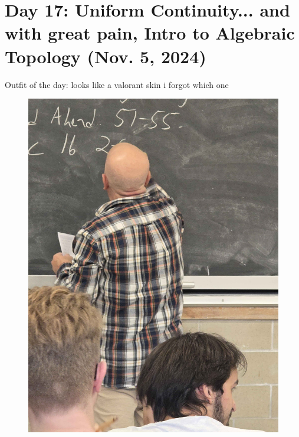 \section{Day 17: Uniform Continuity... and with great pain, Intro to Algebraic Topology (Nov. 5, 2024)}
Outfit of the day: looks like a valorant skin i forgot which one
\begin{figure}[h]
    \centering
    \includegraphics[scale=0.1]{MAT327 Notes/Dror Shirts/dror day 17 shirt.jpg}
\end{figure}

